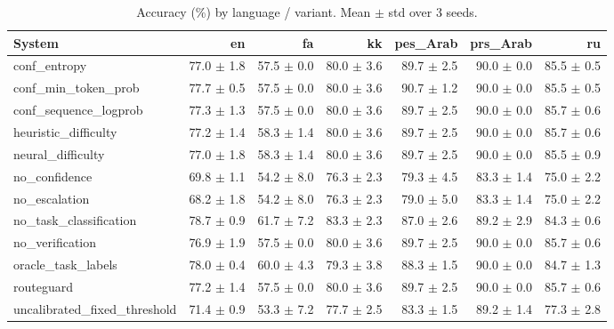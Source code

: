 \begin{table}[t]
\centering
\small
\caption{Accuracy (\%) by language / variant. Mean $\pm$ std over 3 seeds.}
\label{tab:language_breakdown}
\begin{tabular}{lrrrrrr}
\toprule
System & en & fa & kk & pes\_Arab & prs\_Arab & ru \\
\midrule
conf\_entropy & 77.0 $\pm$ 1.8 & 57.5 $\pm$ 0.0 & 80.0 $\pm$ 3.6 & 89.7 $\pm$ 2.5 & 90.0 $\pm$ 0.0 & 85.5 $\pm$ 0.5 \\
conf\_min\_token\_prob & 77.7 $\pm$ 0.5 & 57.5 $\pm$ 0.0 & 80.0 $\pm$ 3.6 & 90.7 $\pm$ 1.2 & 90.0 $\pm$ 0.0 & 85.5 $\pm$ 0.5 \\
conf\_sequence\_logprob & 77.3 $\pm$ 1.3 & 57.5 $\pm$ 0.0 & 80.0 $\pm$ 3.6 & 89.7 $\pm$ 2.5 & 90.0 $\pm$ 0.0 & 85.7 $\pm$ 0.6 \\
heuristic\_difficulty & 77.2 $\pm$ 1.4 & 58.3 $\pm$ 1.4 & 80.0 $\pm$ 3.6 & 89.7 $\pm$ 2.5 & 90.0 $\pm$ 0.0 & 85.7 $\pm$ 0.6 \\
neural\_difficulty & 77.0 $\pm$ 1.8 & 58.3 $\pm$ 1.4 & 80.0 $\pm$ 3.6 & 89.7 $\pm$ 2.5 & 90.0 $\pm$ 0.0 & 85.5 $\pm$ 0.9 \\
no\_confidence & 69.8 $\pm$ 1.1 & 54.2 $\pm$ 8.0 & 76.3 $\pm$ 2.3 & 79.3 $\pm$ 4.5 & 83.3 $\pm$ 1.4 & 75.0 $\pm$ 2.2 \\
no\_escalation & 68.2 $\pm$ 1.8 & 54.2 $\pm$ 8.0 & 76.3 $\pm$ 2.3 & 79.0 $\pm$ 5.0 & 83.3 $\pm$ 1.4 & 75.0 $\pm$ 2.2 \\
no\_task\_classification & 78.7 $\pm$ 0.9 & 61.7 $\pm$ 7.2 & 83.3 $\pm$ 2.3 & 87.0 $\pm$ 2.6 & 89.2 $\pm$ 2.9 & 84.3 $\pm$ 0.6 \\
no\_verification & 76.9 $\pm$ 1.9 & 57.5 $\pm$ 0.0 & 80.0 $\pm$ 3.6 & 89.7 $\pm$ 2.5 & 90.0 $\pm$ 0.0 & 85.7 $\pm$ 0.6 \\
oracle\_task\_labels & 78.0 $\pm$ 0.4 & 60.0 $\pm$ 4.3 & 79.3 $\pm$ 3.8 & 88.3 $\pm$ 1.5 & 90.0 $\pm$ 0.0 & 84.7 $\pm$ 1.3 \\
routeguard & 77.2 $\pm$ 1.4 & 57.5 $\pm$ 0.0 & 80.0 $\pm$ 3.6 & 89.7 $\pm$ 2.5 & 90.0 $\pm$ 0.0 & 85.7 $\pm$ 0.6 \\
uncalibrated\_fixed\_threshold & 71.4 $\pm$ 0.9 & 53.3 $\pm$ 7.2 & 77.7 $\pm$ 2.5 & 83.3 $\pm$ 1.5 & 89.2 $\pm$ 1.4 & 77.3 $\pm$ 2.8 \\
\bottomrule
\end{tabular}
\end{table}
